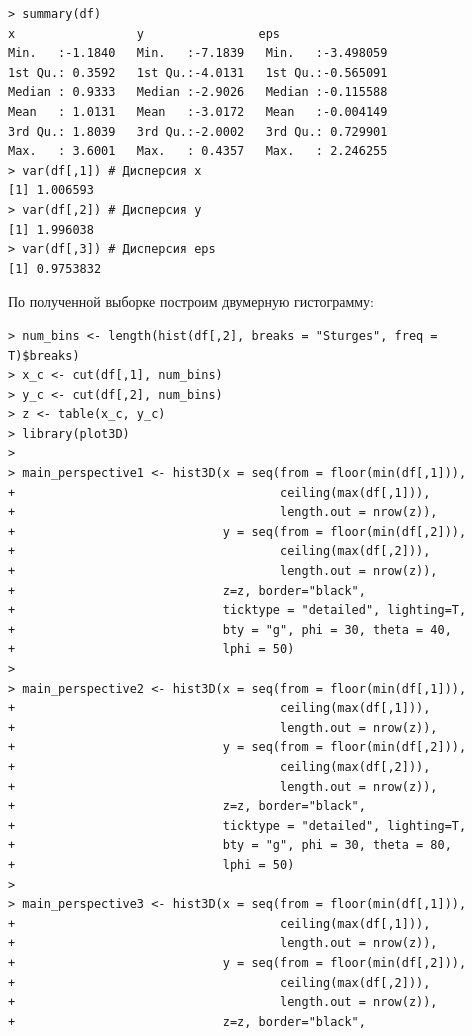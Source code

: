 \documentclass[14pt,a4paper]{scrartcl}
\begin{document}
\pagebreak
\clearpage
\begin{verbatim}
> summary(df)
x                 y                eps           
Min.   :-1.1840   Min.   :-7.1839   Min.   :-3.498059  
1st Qu.: 0.3592   1st Qu.:-4.0131   1st Qu.:-0.565091  
Median : 0.9333   Median :-2.9026   Median :-0.115588  
Mean   : 1.0131   Mean   :-3.0172   Mean   :-0.004149  
3rd Qu.: 1.8039   3rd Qu.:-2.0002   3rd Qu.: 0.729901  
Max.   : 3.6001   Max.   : 0.4357   Max.   : 2.246255  
> var(df[,1]) # Дисперсия x
[1] 1.006593
> var(df[,2]) # Дисперсия y
[1] 1.996038
> var(df[,3]) # Дисперсия eps
[1] 0.9753832
\end{verbatim}

По полученной выборке построим двумерную гистограмму:
\begin{verbatim}
> num_bins <- length(hist(df[,2], breaks = "Sturges", freq = T)$breaks)
> x_c <- cut(df[,1], num_bins)
> y_c <- cut(df[,2], num_bins)
> z <- table(x_c, y_c)
> library(plot3D)
> 
> main_perspective1 <- hist3D(x = seq(from = floor(min(df[,1])), 
+                                     ceiling(max(df[,1])), 
+                                     length.out = nrow(z)),
+                             y = seq(from = floor(min(df[,2])), 
+                                     ceiling(max(df[,2])), 
+                                     length.out = nrow(z)), 
+                             z=z, border="black", 
+                             ticktype = "detailed", lighting=T, 
+                             bty = "g", phi = 30, theta = 40, 
+                             lphi = 50)
> 
> main_perspective2 <- hist3D(x = seq(from = floor(min(df[,1])), 
+                                     ceiling(max(df[,1])), 
+                                     length.out = nrow(z)),
+                             y = seq(from = floor(min(df[,2])), 
+                                     ceiling(max(df[,2])), 
+                                     length.out = nrow(z)),
+                             z=z, border="black", 
+                             ticktype = "detailed", lighting=T, 
+                             bty = "g", phi = 30, theta = 80, 
+                             lphi = 50)
> 
> main_perspective3 <- hist3D(x = seq(from = floor(min(df[,1])), 
+                                     ceiling(max(df[,1])), 
+                                     length.out = nrow(z)),
+                             y = seq(from = floor(min(df[,2])), 
+                                     ceiling(max(df[,2])), 
+                                     length.out = nrow(z)),
+                             z=z, border="black", 

\end{verbatim}
\end{document}
